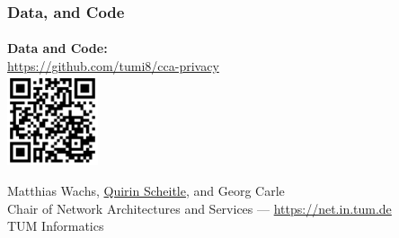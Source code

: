 \begin{frame}
\frametitle{Data, and Code}
\framesubtitle{}

\textbf{Data and Code: }\\
\url{https://github.com/tumi8/cca-privacy}\\
\includegraphics[width=0.2\textwidth]{github-qr.png}

Matthias Wachs, \underline{Quirin Scheitle}, and Georg Carle \\ 
Chair of Network Architectures and Services --- \url{https://net.in.tum.de} \\
TUM Informatics\\


\end{frame}
\clearpage











